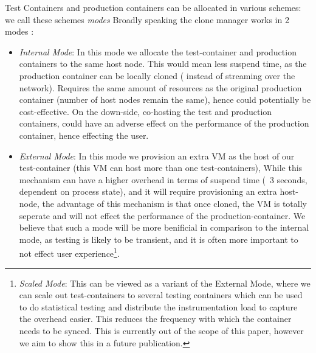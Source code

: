 Test Containers and production containers can be allocated in various schemes: we call these schemes \textit{modes} 
Broadly speaking the clone manager works in 2 modes : 
\begin{itemize}
\item \textit{Internal Mode}: In this mode we allocate the test-container and  production containers to the same host node. 
This would mean less suspend time, as the production container can be locally cloned ( instead of streaming over the network). 
Requires the same amount of resources as the original production container (number of host nodes remain the same), hence could potentially be cost-effective.
On the down-side, co-hosting the test and production containers, could have an adverse effect on the performance of the production container, hence effecting the user.
\item \textit{External Mode}: In this mode we provision an extra VM as the host of our test-container (this VM can host more than one test-containers), 
While this mechanism can have a higher overhead in terms of suspend time (~3 seconds, dependent on process state), and it will require provisioning an extra host-node, the advantage of this mechanism is that once cloned, the VM is totally seperate and will not effect the performance of the production-container.
We believe that such a mode will be more benificial in comparison to the internal mode, as testing is likely to be transient, and it is often more important to not effect user experience\footnote{ \textit{Scaled Mode}: This can be viewed as a variant of the External Mode, where we can scale out test-containers to several testing containers which can be used to do statistical testing and distribute the instrumentation load to capture the overhead easier. This reduces the frequency with which the container needs to be synced. This is currently out of the scope of this paper, however we aim to show this in a future publication.}.
\end{itemize}


